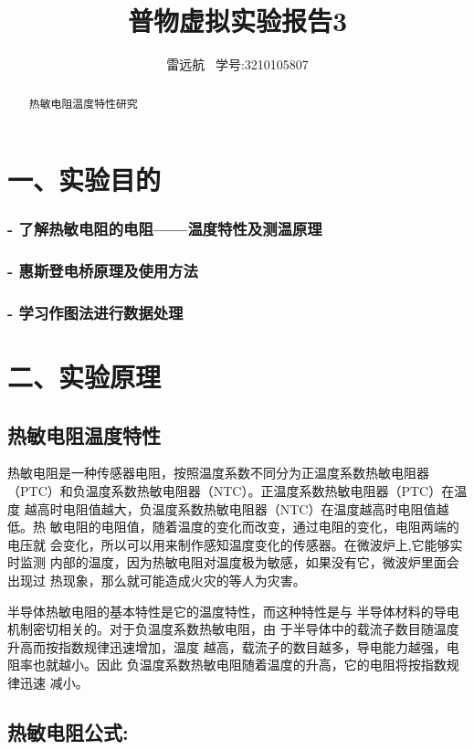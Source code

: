 \documentclass{article}
\title{普物虚拟实验报告3}
\author{雷远航 \ 学号:3210105807}
\begin{document}
\maketitle

\begin{abstract}
    热敏电阻温度特性研究
\end{abstract}

\section*{一、实验目的}
\subsubsection*{- 了解热敏电阻的电阻——温度特性及测温原理}
\subsubsection*{- 惠斯登电桥原理及使用方法}
\subsubsection*{- 学习作图法进行数据处理}



\section*{二、实验原理}

\subsection*{热敏电阻温度特性}
热敏电阻是一种传感器电阻，按照温度系数不同分为正温度系数热敏电阻器
（PTC）和负温度系数热敏电阻器（NTC）。正温度系数热敏电阻器（PTC）在温度
越高时电阻值越大，负温度系数热敏电阻器（NTC）在温度越高时电阻值越低。热
敏电阻的电阻值，随着温度的变化而改变，通过电阻的变化，电阻两端的电压就
会变化，所以可以用来制作感知温度变化的传感器。在微波炉上,它能够实时监测
内部的温度，因为热敏电阻对温度极为敏感，如果没有它，微波炉里面会出现过
热现象，那么就可能造成火灾的等人为灾害。

半导体热敏电阻的基本特性是它的温度特性，而这种特性是与
半导体材料的导电机制密切相关的。对于负温度系数热敏电阻，由
于半导体中的载流子数目随温度升高而按指数规律迅速增加，温度
越高，载流子的数目越多，导电能力越强，电阻率也就越小。因此
负温度系数热敏电阻随着温度的升高，它的电阻将按指数规律迅速
减小。

\subsection*{热敏电阻公式:}
\end{document}

